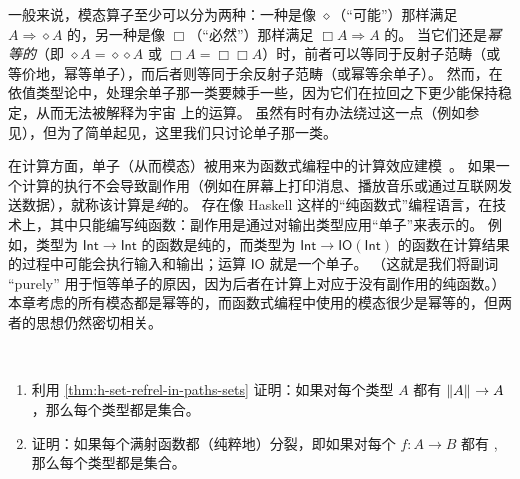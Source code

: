 一般来说，模态算子至少可以分为两种：一种是像 $\diamond$（“可能”）那样满足 $A\Rightarrow \diamond A$ 的，另一种是像 $\Box$（“必然”）那样满足 $\Box A \Rightarrow A$ 的。
当它们还是\emph{幂等的}（即 $\diamond A = \diamond{\diamond A}$ 或 $\Box A = \Box{\Box A}$）时，前者可以等同于反射子范畴（或等价地，幂等单子），而后者则等同于余反射子范畴（或幂等余单子）。
然而，在依值类型论中，处理余单子那一类要棘手一些，因为它们在拉回之下更少能保持稳定，从而无法被解释为宇宙 \UU 上的运算。
虽然有时有办法绕过这一点（例如参见\cite{QGFTinCHoTT12}），但为了简单起见，这里我们只讨论单子那一类。

在计算方面，单子（从而模态）被用来为函数式编程中的计算效应建模~\cite{Moggi89}。%
%
如果一个计算的执行不会导致副作用（例如在屏幕上打印消息、播放音乐或通过互联网发送数据），就称该计算是\emph{纯}的。
存在像 Haskell 这样的“纯函数式”编程语言，在技术上，其中只能编写纯函数：副作用是通过对输出类型应用“单子”来表示的。
例如，类型为 $\mathsf{Int}\to\mathsf{Int}$ 的函数是纯的，而类型为 $\mathsf{Int}\to \mathsf{IO}(\mathsf{Int})$ 的函数在计算结果的过程中可能会执行输入和输出；运算 $\mathsf{IO}$ 就是一个单子。
%
（这就是我们将副词 “purely” 用于恒等单子的原因，因为后者在计算上对应于没有副作用的纯函数。）
本章考虑的所有模态都是幂等的，而函数式编程中使用的模态很少是幂等的，但两者的思想仍然密切相关。

\sectionExercises

\begin{ex}\label{ex:all-types-sets}\
  \begin{enumerate}
    \item 利用 \cref{thm:h-set-refrel-in-paths-sets} 证明：如果对每个类型 $A$ 都有 $\mathopen{}\left\Vert A\right\Vert_{}\mathclose{}\to A$，那么每个类型都是集合。
    \item 证明：如果每个满射函数都（纯粹地）分裂，即如果对每个 $f:A\to B$ 都有
    ,
    那么每个类型都是集合。
  \end{enumerate}
\end{ex}

